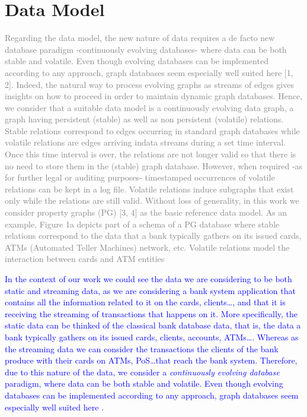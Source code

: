 
\section{Data Model}

%
%
%

\textcolor{gray}{
Regarding the data model, the new nature of data requires a de facto new database paradigm
-continuously evolving databases- where data can be both stable and volatile. Even though
evolving databases can be implemented according to any approach, graph databases seem
especially well suited here [1, 2]. Indeed, the natural way to process evolving graphs as streams
of edges gives insights on how to proceed in order to maintain dynamic graph databases. Hence,
we consider that a suitable data model is a continuously evolving data graph, a graph having
persistent (stable) as well as non persistent (volatile) relations. Stable relations correspond
to edges occurring in standard graph databases while volatile relations are edges arriving indata streams during a set time interval. Once this time interval is over, the relations are not
longer valid so that there is no need to store them in the (stable) graph database. However,
when required -as for further legal or auditing purposes- timestamped occurrences of volatile
relations can be kept in a log file. Volatile relations induce subgraphs that exist only while the
relations are still valid. Without loss of generality, in this work we consider property graphs
(PG) [3, 4] as the basic reference data model. As an example, Figure 1a depicts part of a schema
of a PG database where stable relations correspond to the data that a bank typically gathers
on its issued cards, ATMs (Automated Teller Machines) network, etc. Volatile relations model
the interaction between cards and ATM entities}


\textcolor{blue}{In the context of our work we could see the data we are considering to be both static and streaming data, as we are considering a bank system application that contains all the information related to it on the cards, clients\dots, and that it is receiving the streaming of transactions that happens on it.
More specifically, the static data can be thinked of the classical bank database data, that is, the data a bank typically gathers on its issued cards, clients, accounts, ATMs\dots. Whereas as the streaming data we can consider the transactions the clients of the bank produce with their cards on ATMs, PoS\dots that reach the bank system.
Therefore, due to this nature of the data, we consider a \emph{continuously evolving database} paradigm, where data can be both stable and volatile. Even though 
evolving databases can be implemented according to any approach, graph databases seem especially well suited here \textcolor{blue}{\cite{angles2008survey, kumar2015graph}}. 
}


